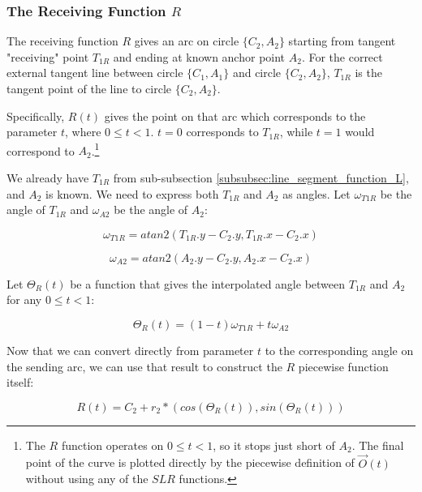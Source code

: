 \documentclass{article}
\begin{document}
\subsubsection{The Receiving Function $R$}
The receiving function $R$ gives an arc on circle $\{C_2, A_2\}$ starting from tangent "receiving" point $T_{1R}$ and ending at known anchor point $A_2$. For the correct external tangent line between circle $\{C_1, A_1\}$ and circle $\{C_2, A_2\}$, $T_{1R}$ is the tangent point of the line to circle $\{C_2, A_2\}$.

Specifically, $R(t)$ gives the point on that arc which corresponds to the parameter $t$, where $0 \leq t < 1$. $t = 0$ corresponds to $T_{1R}$, while $t = 1$ would correspond to $A_{2}$.\footnote{The $R$ function operates on $0 \leq t < 1$, so it stops just short of $A_2$. The final point of the curve is plotted directly by the piecewise definition of $\overrightarrow{O}(t)$ without using any of the $SLR$ functions. }

We already have $T_{1R}$ from sub-subsection \ref{subsubsec:line_segment_function_L}, and $A_2$ is known. We need to express both $T_{1R}$ and $A_2$ as angles. Let $\omega_{T1R}$ be the angle of $T_{1R}$ and $\omega_{A2}$ be the angle of $A_2$:

\begin{equation}
    \label{eq:omega_T1R}
    \omega_{T1R} = atan2(T_{1R}.y - C_2.y, T_{1R}.x - C_2.x)
\end{equation}

\begin{equation}
    \label{eq:omega_A2}
    \omega_{A2} = atan2(A_2.y - C_2.y, A_2.x - C_2.x)
\end{equation}

Let $\Theta_R(t)$ be a function that gives the interpolated angle between $T_{1R}$ and $A_2$ for any $0 \leq t < 1$:

\begin{equation}
    \label{eq:Theta_R(t)}
    \Theta_R(t) = (1-t) \omega_{T1R} + t \omega_{A2}
\end{equation}

Now that we can convert directly from parameter $t$ to the corresponding angle on the sending arc, we can use that result to construct the $R$ piecewise function itself:

\begin{equation}
    \label{eq:R(t)}
    R(t) = C_2 + r_2 * (cos( \Theta_R(t) ), sin( \Theta_R(t) ))
\end{equation}
\end{document}
